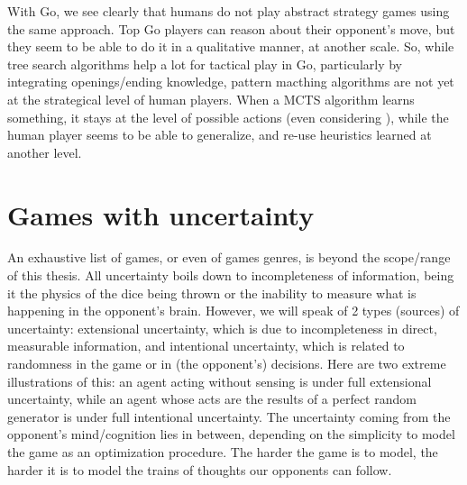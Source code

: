 With Go, we see clearly that humans do not play abstract strategy games using the same approach. Top Go players can reason about their opponent's move, but they seem to be able to do it in a qualitative manner, at another scale. So, while tree search algorithms help a lot for tactical play in Go, particularly by integrating openings/ending knowledge, pattern macthing algorithms are not yet at the strategical level of human players. When a MCTS algorithm learns something, it stays at the level of possible actions (even considering ), while the human player seems to be able to generalize, and re-use heuristics learned at another level.


\section{Games with uncertainty}
An exhaustive list of games, or even of games genres, is beyond the scope/range of this thesis. %
All uncertainty boils down to incompleteness of information, being it the physics of the dice being thrown or the inability to measure what is happening in the opponent's brain. However,  we will speak of 2 types (sources) of uncertainty: extensional uncertainty, which is due to incompleteness in direct, measurable information, and intentional uncertainty, which is related to randomness in the game or in (the opponent's) decisions. Here are two extreme illustrations of this: an agent acting without sensing is under full extensional uncertainty, while an agent whose acts are the results of a perfect random generator is under full intentional uncertainty. The uncertainty coming from the opponent's mind/cognition lies in between, depending on the simplicity to model the game as an optimization procedure. The harder the game is to model, the harder it is to model the trains of thoughts our opponents can follow.

